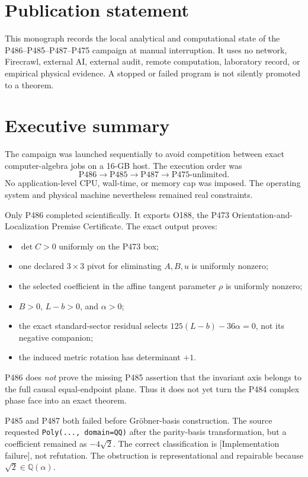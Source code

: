 \documentclass[11pt,a4paper,openany]{report}
\newcommand{\Q}{\mathbb Q}
\newcommand{\statusFailed}{\textcolor{finred}{[Implementation failure]}}
\begin{document}
\chapter*{Publication statement}
This monograph records the local analytical and computational state of the
P486--P485--P487--P475 campaign at manual interruption. It uses no network,
Firecrawl, external AI, external audit, remote computation, laboratory
record, or empirical physical evidence. A stopped or failed program is not
silently promoted to a theorem.
\tableofcontents\clearpage{}

\chapter{Executive summary}

The campaign was launched sequentially to avoid competition between exact
computer-algebra jobs on a 16-GB host. The execution order was
\[
 \mathrm{P486}\longrightarrow\mathrm{P485}\longrightarrow
 \mathrm{P487}\longrightarrow\mathrm{P475\mbox{-}unlimited}.
\]
No application-level CPU, wall-time, or memory cap was imposed. The operating
system and physical machine nevertheless remained real constraints.

Only P486 completed scientifically. It exports O188, the P473
Orientation-and-Localization Premise Certificate. The exact output proves:
\begin{itemize}
\item \(\det C>0\) uniformly on the P473 box;
\item one declared \(3\times3\) pivot for eliminating \(A,B,u\) is uniformly
nonzero;
\item the selected coefficient in the affine tangent parameter \(\rho\) is
uniformly nonzero;
\item \(B>0\), \(L-b>0\), and \(\alpha>0\);
\item the exact standard-sector residual selects
\(125(L-b)-36\alpha=0\), not its negative companion;
\item the induced metric rotation has determinant \(+1\).
\end{itemize}

P486 does \emph{not} prove the missing P485 assertion that the invariant axis
belongs to the full causal equal-endpoint plane. Thus it does not yet turn the
P484 complex phase face into an exact theorem.

P485 and P487 both failed before Gröbner-basis construction. The source
requested \texttt{Poly(..., domain=QQ)} after the parity-basis transformation,
but a coefficient remained as \(-4\sqrt2\). The correct classification is
\statusFailed{}, not refutation. The obstruction is representational and
repairable because \(\sqrt2\in\Q(\alpha)\).
\end{document}
